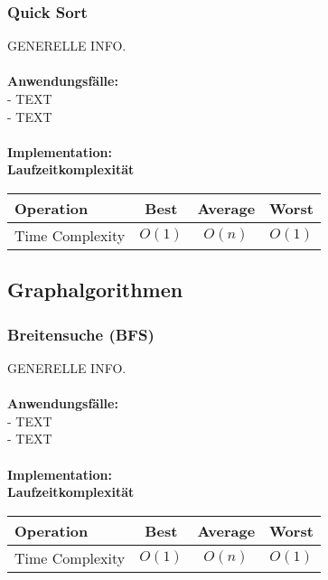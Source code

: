 \documentclass[../main.tex]{subfiles}
\begin{document}
	\subsubsection{Quick Sort}
	GENERELLE INFO. \\\\
	\textbf{Anwendungsfälle:}\\
	- TEXT\\
	- TEXT\\\\
	\textbf{Implementation:}\\
	 
	\textbf{Laufzeitkomplexität}\\
	\begin{table}[ht]
		\centering
		\begin{tabular}{l *{3}{c}}
			\toprule
			Operation & Best & Average & Worst\\
			\midrule
			Time Complexity & $O(1)$ & $O(n)$ & $O(1)$\\
			\bottomrule
		\end{tabular}
	\end{table}
	\clearpage
	
	\subsection{Graphalgorithmen}
	\subsubsection{Breitensuche (BFS)}
	GENERELLE INFO. \\\\
	\textbf{Anwendungsfälle:}\\
	- TEXT\\
	- TEXT\\\\
	\textbf{Implementation:}\\
	 
	\textbf{Laufzeitkomplexität}\\
	\begin{table}[ht]
		\centering
		\begin{tabular}{l *{3}{c}}
			\toprule
			Operation & Best & Average & Worst\\
			\midrule
			Time Complexity & $O(1)$ & $O(n)$ & $O(1)$\\
			\bottomrule
		\end{tabular}
	\end{table}
	\clearpage
	
\end{document}
